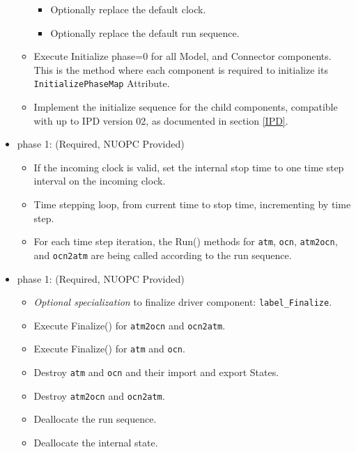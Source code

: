 \begin{itemize}
\begin{itemize}
\begin{itemize}
    \item Optionally replace the default clock. 
    \item Optionally replace the default run sequence.
  \end{itemize}
  \item Execute Initialize phase=0 for all Model, and Connector components. This is the method where each component is required to initialize its {\tt InitializePhaseMap} Attribute.
  \item Implement the initialize sequence for the child components, compatible with up to IPD version 02, as documented in section \ref{IPD}.
  \end{itemize}  
\end{itemize}

\begin{itemize}
\item phase 1: ({\sc Required, NUOPC Provided})
  \begin{itemize}
  \item If the incoming clock is valid, set the internal stop time to one time step interval on the incoming clock.
  \item Time stepping loop, from current time to stop time, incrementing by time step.
  \item For each time step iteration, the Run() methods for {\tt atm}, {\tt ocn}, {\tt atm2ocn}, and {\tt ocn2atm} are being called according to the run sequence.
  \end{itemize}    
\end{itemize}

\begin{itemize}
\item phase 1: ({\sc Required, NUOPC Provided})
  \begin{itemize}
  \item {\it Optional specialization} to finalize driver component: {\tt label\_Finalize}.
  \item Execute Finalize() for {\tt atm2ocn} and {\tt ocn2atm}.
  \item Execute Finalize() for {\tt atm} and {\tt ocn}.
  \item Destroy {\tt atm} and {\tt ocn} and their import and export States.
  \item Destroy {\tt atm2ocn} and {\tt ocn2atm}.
  \item Deallocate the run sequence.
  \item Deallocate the internal state.
  \end{itemize}      
\end{itemize}

